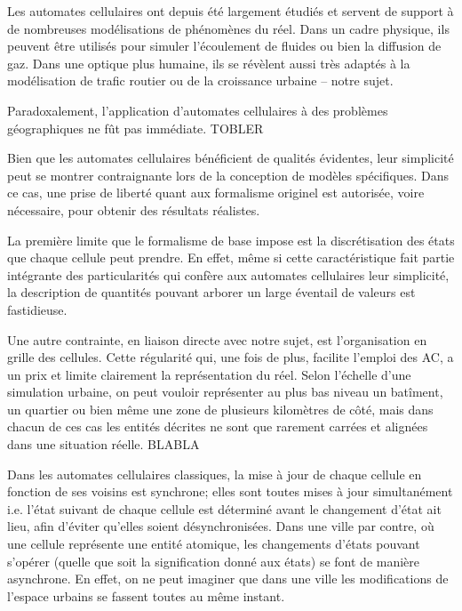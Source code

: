 \documentclass[10pt,twocolumn]{article}
\begin{document}
Les automates cellulaires ont depuis été largement étudiés et servent
de support à de nombreuses modélisations de phénomènes du réel. Dans
un cadre physique, ils peuvent être utilisés pour simuler l'écoulement
de fluides ou bien la diffusion de gaz. Dans une optique plus humaine,
ils se révèlent aussi très adaptés à la modélisation de trafic routier
ou de la croissance urbaine -- notre sujet.

Paradoxalement, l'application d'automates cellulaires à des problèmes
géographiques ne fût pas immédiate. TOBLER

Bien que les automates cellulaires bénéficient de qualités évidentes,
leur simplicité peut se montrer contraignante lors de la conception de
modèles spécifiques. Dans ce cas, une prise de liberté quant aux
formalisme originel est autorisée, voire nécessaire, pour obtenir des
résultats réalistes.

La première limite que le formalisme de base impose est la
discrétisation des états que chaque cellule peut prendre. En effet,
même si cette caractéristique fait partie intégrante des
particularités qui confère aux automates cellulaires leur simplicité,
la description de quantités pouvant arborer un large éventail de
valeurs est fastidieuse.

Une autre contrainte, en liaison directe avec notre sujet, est
l'organisation en grille des cellules. Cette régularité qui, une fois
de plus, facilite l'emploi des AC, a un prix et limite clairement la
représentation du réel. Selon l'échelle d'une simulation urbaine, on
peut vouloir représenter au plus bas niveau un batîment, un quartier
ou bien même une zone de plusieurs kilomètres de côté, mais dans
chacun de ces cas les entités décrites ne sont que rarement carrées et
alignées dans une situation réelle. BLABLA

Dans les automates cellulaires classiques, la mise à jour de chaque
cellule en fonction de ses voisins est synchrone; elles sont toutes
mises à jour simultanément i.e. l'état suivant de chaque cellule est
déterminé avant le changement d'état ait lieu, afin d'éviter qu'elles
soient désynchronisées. Dans une ville par contre, où une cellule
représente une entité atomique, les changements d'états pouvant
s'opérer (quelle que soit la signification donné aux états) se font de
manière asynchrone. En effet, on ne peut imaginer que dans une ville
les modifications de l'espace urbains se fassent toutes au même
instant.

\printbibliography
\end{document}
